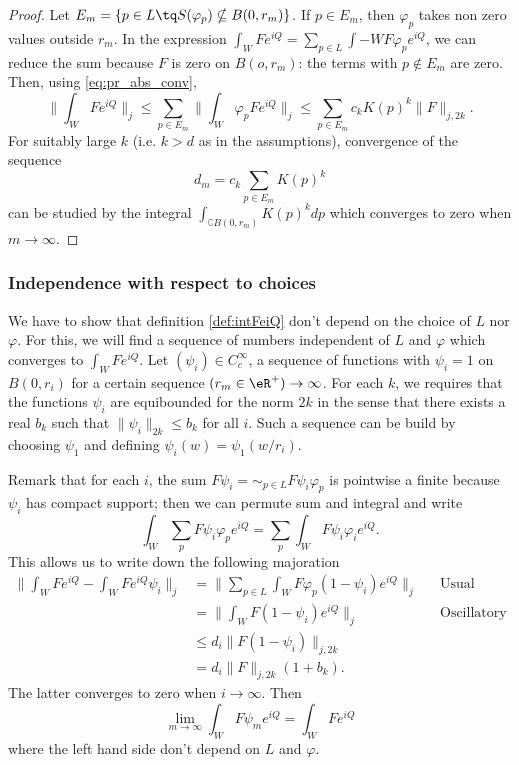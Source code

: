 \begin{proof}
Let $E_m=\{ p\in L\tq S(\varphi_p)\nsubseteq B(0,r_m) \}$. If $p\in E_m$, then $\varphi_p$ takes non zero values outside $r_m$. In the expression $\int_WFe^{iQ}=\sum_{p\in L}\int-WF\varphi_pe^{iQ}$, we can reduce the sum because $F$ is zero on $B(o,r_m)$: the terms with $p\notin E_m$ are zero. Then, using \eqref{eq:pr_abs_conv},
\[ 
  \| \int_WFe^{iQ} \|_j\leq\sum_{p\in E_m}\| \int_W\varphi_pFe^{iQ} \|_j\leq\sum_{p\in E_m}c_kK(p)^k\| F \|_{j,2k}.
\]
For suitably large $k$ (i.e. $k>d$ as in the assumptions), convergence of the sequence
\[
 d_m=c_k\sum_{p\in E_m}K(p)^k
\] 
can be studied by the integral $\int_{\complement B(0,r_m)}K(p)^kdp$ which converges to zero when $m\to\infty$.
\end{proof}

\subsubsection{Independence with respect to choices}

We have to show that definition \ref{def:intFeiQ} don't depend on the choice of $L$ nor $\varphi$. For this, we will find a sequence of numbers independent of $L$ and $\varphi$ which converges to $\int_WFe^{iQ}$. Let $(\psi_i)\in C^{\infty}_c$, a sequence of functions with $\psi_i=1$ on $B(0,r_i)$ for a certain sequence $(r_m\in\eR^+)\to\infty$. For each $k$, we requires that the functions $\psi_i$ are equibounded for the norm $2k$ in the sense that there exists a real $b_k$ such that $\| \psi_i \|_{2k}\leq b_k$ for all $i$. Such a sequence can be build by choosing $\psi_1$ and defining $\psi_i(w)=\psi_1(w/r_i)$. 

Remark that for each $i$, the sum $F\psi_i=\sim_{p\in L}F\psi_i\varphi_p$ is pointwise a finite because $\psi_i$ has compact support; then we can permute sum and integral and write
\[ 
  \int_W \sum_pF\psi_i\varphi_pe^{iQ}=\sum_p\int_WF\psi_i\varphi_ie^{iQ}.
\]
This allows us to write down the following majoration
\begin{equation}
\begin{aligned}
 \| \int_WFe^{iQ}-\int_WFe^{iQ}\psi_i \|_j&=\| \sum_{p\in L}\int_WF\varphi_p(1-\psi_i)e^{iQ} \|_j&&\textrm{Usual integral}\\
                                          &=\| \int_WF(1-\psi_i)e^{iQ} \|_j                      &&\textrm{Oscillatory integral}\\
                                          & \leq d_i\| F(1-\psi_i) \|_{j,2k}\\
                  &=d_i\| F \|_{j,2k}(1+b_k).
\end{aligned}
\end{equation}
The latter converges to zero when $i\to\infty$. Then 
\begin{equation}
   \lim_{m\to\infty}\int_WF\psi_me^{iQ}=\int_WFe^{iQ}
\end{equation}
where the left hand side don't depend on $L$ and $\varphi$.

